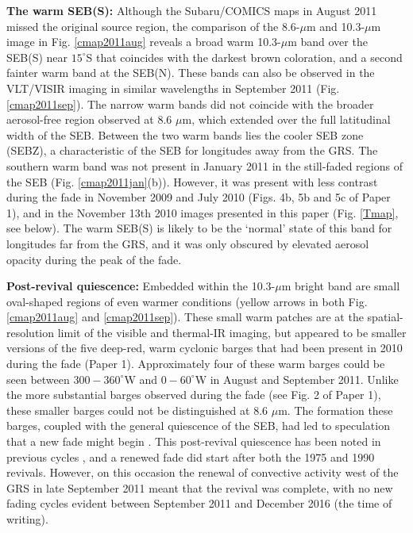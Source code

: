 \documentclass[final,authoryear,5p,times,twocolumn]{elsarticle}
\begin{document}
\textbf{The warm SEB(S):} Although the Subaru/COMICS maps in August 2011 missed the original source region, the comparison of the 8.6-$\mu$m and 10.3-$\mu$m image in Fig. \ref{cmap2011aug} reveals a broad warm 10.3-$\mu$m band over the SEB(S) near $15^\circ$S that coincides with the darkest brown coloration, and a second fainter warm band at the SEB(N).  These bands can also be observed in the VLT/VISIR imaging in similar wavelengths in September 2011 (Fig. \ref{cmap2011sep}). The narrow warm bands did not coincide with the broader aerosol-free region observed at 8.6 $\mu$m, which extended over the full latitudinal width of the SEB.  Between the two warm bands lies the cooler SEB zone (SEBZ), a characteristic of the SEB for longitudes away from the GRS.  The southern warm band was not present in January 2011 in the still-faded regions of the SEB (Fig. \ref{cmap2011jan}(b)).  However, it was present with less contrast during the fade in November 2009 and July 2010 (Figs. 4b, 5b and 5c of Paper 1), and in the November 13th 2010 images presented in this paper (Fig. \ref{Tmap}, see below).  The warm SEB(S) is likely to be the `normal' state of this band for longitudes far from the GRS, and it was only obscured by elevated aerosol opacity during the peak of the fade.

\textbf{Post-revival quiescence: } Embedded within the 10.3-$\mu$m bright band are small oval-shaped regions of even warmer conditions (yellow arrows in both Fig. \ref{cmap2011aug} and \ref{cmap2011sep}).  These small warm patches are at the spatial-resolution limit of the visible and thermal-IR imaging, but appeared to be smaller versions of the five deep-red, warm cyclonic barges that had been present in 2010 during the fade (Paper 1).  Approximately four of these warm barges could be seen between $300-360^\circ$W and $0-60^\circ$W in August and September 2011.  Unlike the more substantial barges observed during the fade (see Fig. 2 of Paper 1), these smaller barges could not be distinguished at 8.6 $\mu$m.  The formation these barges, coupled with the general quiescence of the SEB, had led to speculation that a new fade might begin \citep{15rogers, 16rogers}.  This post-revival quiescence has been noted in previous cycles \citep[1971, 1975, 1990, 1993,][]{16rogers}, and a renewed fade did start after both the 1975 and 1990 revivals.  However, on this occasion the renewal of convective activity west of the GRS in late September 2011 meant that the revival was complete, with no new fading cycles evident between September 2011 and December 2016 (the time of writing).  
\end{document}
